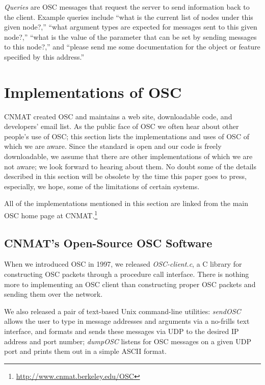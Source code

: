 \textit{Queries} are OSC messages that request the server to send information
back to the client. Example queries include ``what is the current list of nodes
under this given node?,'' ``what argument types are expected for messages sent to
this given node?,'' ``what is the value of the parameter that can be set by
sending messages to this node?,'' and ``please send me some documentation for the
object or feature specified by this address.''

\section{Implementations of OSC }

CNMAT created OSC and maintains a web site, downloadable code, and developers'
email list.  As the public face of OSC we often hear about other people's use of
OSC; this section lists the implementations and uses of OSC of which we are
aware.  Since the standard is open and our code is freely downloadable, we assume
that there are other implementations of which we are not aware; we look forward
to hearing about them.  No doubt some of the details described in this section
will be obsolete by the time this paper goes to press, especially, we hope, some
of the limitations of certain systems.

All of the implementations mentioned in this section are linked from the main
OSC home page at CNMAT.\footnote{\url{http://www.cnmat.berkeley.edu/OSC}}

\subsection{CNMAT's Open-Source OSC Software}


When we introduced OSC in 1997, we released \textit{OSC-client.c}, a C library
for constructing OSC packets through a procedure call interface. There is nothing
more to implementing an OSC client than constructing proper OSC packets and
sending them over the network.

We also released a pair of text-based Unix command-line utilities:
\textit{sendOSC} allows the user to type in message addresses and arguments via a
no-frills text interface, and formats and sends these messages via UDP to the
desired IP address and port number; \textit{dumpOSC} listens for OSC messages on
a given UDP port and prints them out in a simple ASCII format.

